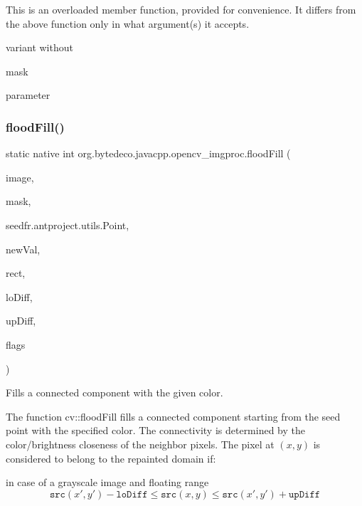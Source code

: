 This is an overloaded member function, provided for convenience. It differs from the above function only in what argument(s) it accepts. 

variant without
\begin{DoxyCode}
mask 
\end{DoxyCode}
 parameter \mbox{\label{group__imgproc__misc_gae1a712c481241605487f34e3b969f49c}} 
\subsubsection{\texorpdfstring{flood\+Fill()}{floodFill()}\hspace{0.1cm}{\footnotesize\ttfamily [2/2]}}
{\footnotesize\ttfamily static native int org.\+bytedeco.\+javacpp.\+opencv\+\_\+imgproc.\+flood\+Fill (\begin{DoxyParamCaption}\item[{@By\+Val Mat}]{image,  }\item[{@By\+Val Mat}]{mask,  }\item[{@By\+Val fr.antproject.utils.Point}]{seed\+fr.antproject.utils.Point,  }\item[{@By\+Val Scalar}]{new\+Val,  }\item[{Rect}]{rect,  }\item[{@By\+Val(null\+Value=\char`\"{}cv\+::\+Scalar()\char`\"{}) Scalar}]{lo\+Diff,  }\item[{@By\+Val(null\+Value=\char`\"{}cv\+::\+Scalar()\char`\"{}) Scalar}]{up\+Diff,  }\item[{int}]{flags }\end{DoxyParamCaption})\hspace{0.3cm}{\ttfamily [static]}}



Fills a connected component with the given color. 

The function cv\+::flood\+Fill fills a connected component starting from the seed point with the specified color. The connectivity is determined by the color/brightness closeness of the neighbor pixels. The pixel at $(x,y)$ is considered to belong to the repainted domain if\+: 


\begin{DoxyItemize}
\item in case of a grayscale image and floating range \[\texttt{src} (x',y')- \texttt{loDiff} \leq \texttt{src} (x,y) \leq \texttt{src} (x',y')+ \texttt{upDiff}\] 
\end{DoxyItemize}


